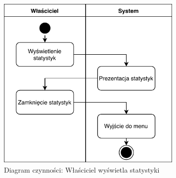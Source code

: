 \begin{figure}[H]
	\centering
	\includegraphics[width=90mm]{diagramy/DiagCzynStatystyki.pdf}
	\caption{Diagram czynności: Właściciel wyświetla statystyki \label{overflow}}
\end{figure}





